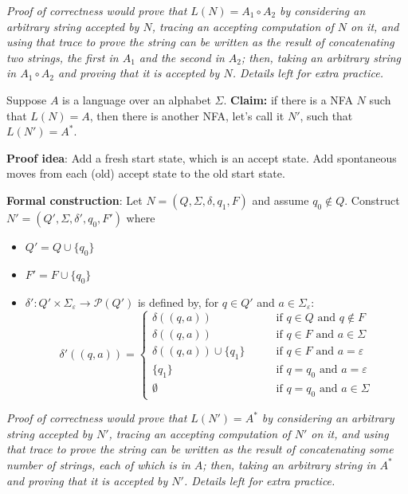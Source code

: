 \documentclass[12pt, oneside]{article}
\begin{document}
\vfill

{\it Proof of correctness would prove that $L(N) = A_1 \circ A_2$ by considering
an arbitrary string accepted by $N$, tracing an accepting computation of $N$ on it, and using 
that trace to prove the string can be written as the result of concatenating two strings, 
the first in $A_1$ and the second in $A_2$; then, taking an arbitrary 
string in $A_1 \circ A_2$ and proving that it is accepted by $N$. Details left for extra practice.}

\newpage



Suppose $A$ is a language over an alphabet $\Sigma$.
{\bf Claim:} if there is a NFA $N$ such that $L(N) = A$, then there is another NFA, let's call it $N'$, such that 
$L(N') = A^*$.

{\bf Proof idea}: Add a fresh start state, which is an accept state. Add spontaneous 
moves from each (old) accept state to the old start state.

{\bf Formal construction}: Let 
$N = (Q, \Sigma, \delta, q_1, F)$ and assume $q_0 \notin Q$.
Construct $N' = (Q', \Sigma, \delta', q_0, F')$ where
\begin{itemize}
    \item $Q' = Q \cup \{q_0\}$
    \item $F' = F \cup \{q_0\}$
    \item $\delta': Q' \times \Sigma_\varepsilon \to \mathcal{P}(Q')$ is defined by, for $q \in Q'$ and $a \in \Sigma_{\varepsilon}$:
        \[
            \delta'((q,a))=\begin{cases}  
                \delta ((q,a)) &\qquad\text{if } q\in Q \textrm{ and } q \notin F\\ 
                \delta ((q,a)) &\qquad\text{if } q\in F \textrm{ and } a \in \Sigma\\ 
                \delta ((q,a)) \cup \{q_1\} &\qquad\text{if } q\in F \textrm{ and } a = \varepsilon\\ 
                \{q_1\} &\qquad\text{if } q = q_0 \textrm{ and } a = \varepsilon \\
                \emptyset &\qquad\text{if } q = q_0 \textrm { and } a \in \Sigma
            \end{cases}
        \]
\end{itemize}


{\it Proof of correctness would prove that $L(N') = A^*$ by considering
an arbitrary string accepted by $N'$, tracing an accepting computation of $N'$ on it, and using 
that trace to prove the string can be written as the result of concatenating some number of strings, 
each of which is in $A$; then, taking an arbitrary 
string in $A^*$ and proving that it is accepted by $N'$. Details left for extra practice.}
\end{document}
